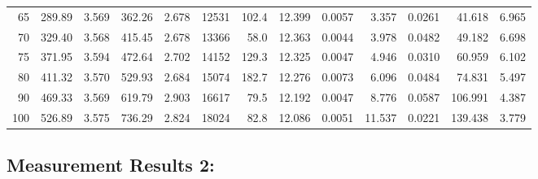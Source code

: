 \documentclass[10pt]{article}
\begin{document}
{\begin{tabular}{|r|rr|rr|rr|rr|rr|r|r|}
       65 &       289.89 &        3.569 &       362.26 &        2.678 &        12531 &        102.4 &       12.399 &       0.0057 &        3.357 &       0.0261 &       41.618 &        6.965 \\
       70 &       329.40 &        3.568 &       415.45 &        2.678 &        13366 &         58.0 &       12.363 &       0.0044 &        3.978 &       0.0482 &       49.182 &        6.698 \\
       75 &       371.95 &        3.594 &       472.64 &        2.702 &        14152 &        129.3 &       12.325 &       0.0047 &        4.946 &       0.0310 &       60.959 &        6.102 \\
       80 &       411.32 &        3.570 &       529.93 &        2.684 &        15074 &        182.7 &       12.276 &       0.0073 &        6.096 &       0.0484 &       74.831 &        5.497 \\
       90 &       469.33 &        3.569 &       619.79 &        2.903 &        16617 &         79.5 &       12.192 &       0.0047 &        8.776 &       0.0587 &      106.991 &        4.387 \\
      100 &       526.89 &        3.575 &       736.29 &        2.824 &        18024 &         82.8 &       12.086 &       0.0051 &       11.537 &       0.0221 &      139.438 &        3.779 \\
\hline
\end{tabular}
}



\subsection*{\large \bf Measurement Results 2:}
\end{document}
